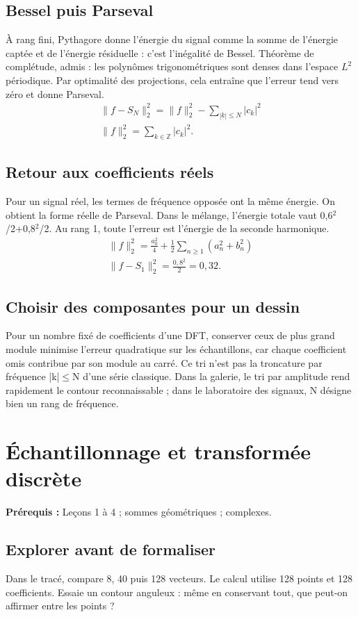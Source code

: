 \documentclass[11pt,a4paper]{article}
\begin{document}
\subsection{Bessel puis Parseval}
À rang fini, Pythagore donne l’énergie du signal comme la somme de l’énergie captée et de l’énergie résiduelle : c’est l’inégalité de Bessel. Théorème de complétude, admis : les polynômes trigonométriques sont denses dans l’espace $L^2$ périodique. Par optimalité des projections, cela entraîne que l’erreur tend vers zéro et donne Parseval.
\[\begin{gathered}\|f-S_N\|_2^2=\|f\|_2^2-\sum_{|k|\le N}|c_k|^2\\\|f\|_2^2=\sum_{k\in\mathbb Z}|c_k|^2.\end{gathered}\]
\subsection{Retour aux coefficients réels}
Pour un signal réel, les termes de fréquence opposée ont la même énergie. On obtient la forme réelle de Parseval. Dans le mélange, l’énergie totale vaut 0,6$^2$/2+0,8$^2$/2. Au rang 1, toute l’erreur est l’énergie de la seconde harmonique.
\[\begin{gathered}\|f\|_2^2=\frac{a_0^2}{4}+\frac12\sum_{n\ge1}(a_n^2+b_n^2)\\ \|f-S_1\|_2^2=\frac{0{,}8^2}{2}=0{,}32.\end{gathered}\]
\subsection{Choisir des composantes pour un dessin}
Pour un nombre fixé de coefficients d’une DFT, conserver ceux de plus grand module minimise l’erreur quadratique sur les échantillons, car chaque coefficient omis contribue par son module au carré. Ce tri n’est pas la troncature par fréquence |k|$\le$N d’une série classique. Dans la galerie, le tri par amplitude rend rapidement le contour reconnaissable ; dans le laboratoire des signaux, N désigne bien un rang de fréquence.
\clearpage
\section{Échantillonnage et transformée discrète}
\textbf{Prérequis :} Leçons 1 à 4 ; sommes géométriques ; complexes.
\subsection*{Explorer avant de formaliser}Dans le tracé, compare 8, 40 puis 128 vecteurs. Le calcul utilise 128 points et 128 coefficients. Essaie un contour anguleux : même en conservant tout, que peut-on affirmer entre les points ?
\end{document}
